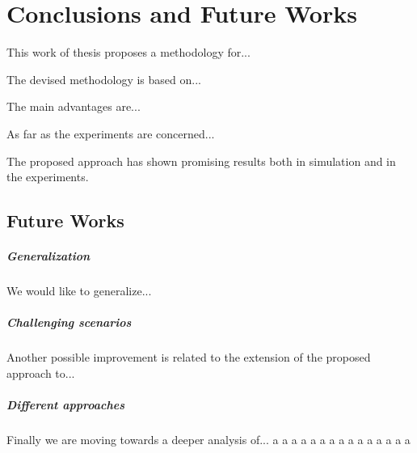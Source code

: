 \chapter{Conclusions and Future Works}
\label{chap:Conclusions}
\thispagestyle{plain}
\vspace{0.5cm}

\noindent

This work of thesis proposes a methodology for...

The devised methodology is based on...

The main advantages are...

As far as the experiments are concerned...

The proposed approach has shown promising results both in simulation and in the experiments.


\section{Future Works}

\paragraph{Generalization}
We would like to generalize...

\paragraph{Challenging scenarios}
Another possible improvement is related to the extension of the proposed approach to...

\paragraph{Different approaches}
Finally we are moving towards a deeper analysis of...
a
a
a
a
a
a
a
a
a
a
a
a
a
a
a
